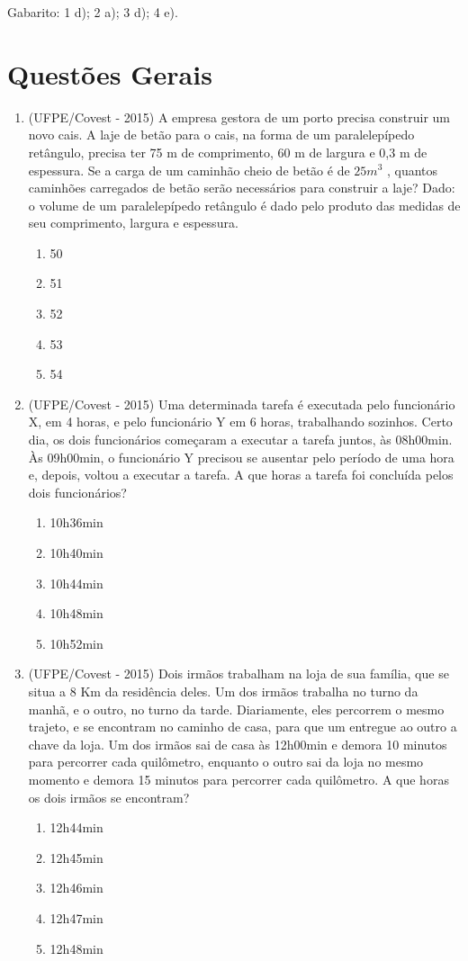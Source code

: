 Gabarito: 1 d); 2 a); 3 d); 4 e).

\section{Questões Gerais}

\begin{enumerate}
 \item (UFPE/Covest - 2015) A empresa gestora de um porto precisa construir um novo cais. A laje de betão para o cais, na forma de um paralelepípedo retângulo, precisa ter 75 m de comprimento, 60 m de largura e 0,3 m de espessura. Se a carga de um caminhão cheio de betão é de $25 m^3$ , quantos caminhões carregados de betão serão necessários para construir a laje? Dado: o volume de um paralelepípedo retângulo é dado pelo produto das medidas de seu comprimento, largura e espessura.
 \begin{enumerate}
 \item 50
 \item 51
 \item 52
 \item 53
 \item 54
\end{enumerate}

 \item (UFPE/Covest - 2015) Uma determinada tarefa é executada pelo funcionário X, em 4 horas, e pelo funcionário Y em 6 horas, trabalhando sozinhos. Certo dia, os dois funcionários começaram a executar a tarefa juntos, às 08h00min. Às 09h00min, o funcionário Y precisou se ausentar pelo período de uma hora e, depois, voltou a executar a tarefa. A que horas a tarefa foi concluída pelos dois funcionários?
 \begin{enumerate}
 \item 10h36min
 \item 10h40min
 \item 10h44min
 \item 10h48min
 \item 10h52min
\end{enumerate}
 
 \item (UFPE/Covest - 2015) Dois irmãos trabalham na loja de sua família, que se situa a 8 Km da residência deles. Um dos irmãos trabalha no turno da manhã, e o outro, no turno da tarde. Diariamente, eles percorrem o mesmo trajeto, e se encontram no caminho de casa, para que um entregue ao outro a chave da loja. Um dos irmãos sai de casa às 12h00min e demora 10 minutos para percorrer cada quilômetro, enquanto o outro sai da loja no mesmo momento e demora 15 minutos para percorrer cada quilômetro. A que horas os dois irmãos se encontram?
 \begin{enumerate}
 \item 12h44min
 \item 12h45min
 \item 12h46min
 \item 12h47min
 \item 12h48min
\end{enumerate}


\end{enumerate}
